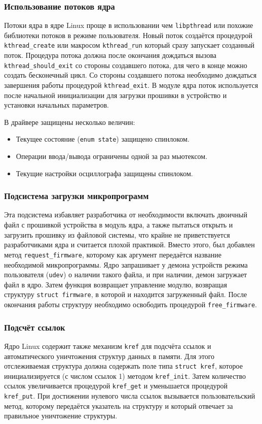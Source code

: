 \documentclass[a4paper,12pt]{report}
\numberwithin{equation}{section}
\begin{document}
\subsubsection{Использование потоков ядра}
Потоки ядра в ядре Linux проще в использовании чем \texttt{libpthread} или
похожие библиотеки потоков в режиме пользователя. Новый поток создаётся
процедурой \texttt{kthread\_create} или макросом \texttt{kthread\_run} который
сразу запускает созданный поток. Процедура потока должна после окончания
дождаться вызова \texttt{kthread\_should\_exit} со стороны создавшего потока,
для чего в конце можно создать бесконечный цикл. Со стороны создавшего потока
необходимо дождаться завершения работы процедурой \texttt{kthread\_exit}. В
модуле ядра поток используется после начальной инициализации для загрузки
прошивки в устройство и установки начальных параметров.

В драйвере защищены несколько величин:
\begin{itemize}
\item Текущее состояние (\texttt{enum state}) защищено спинлоком.
\item Операции ввода/вывода ограничены одной за раз мьютексом.
\item Текущие настройки осциллографа защищены спинлоком.
\end{itemize}

\subsubsection{Подсистема загрузки микропрограмм}
Эта подсистема избавляет разработчика от необходимости включать двоичный файл с
прошивкой устройства в модуль ядра, а также пытаться открыть и загрузить
прошивку из файловой системы, что крайне не приветствуется разработчиками ядра и
считается плохой практикой. Вместо этого, был добавлен метод
\texttt{request\_firmware}, которому как аргумент передаётся название необходимой
микропрограммы. Ядро запрашивает у демона устройств режима пользователя
(\texttt{udev}) о наличии такого файла, и при наличии, демон загружает файл в
ядро. Затем функция возвращает управление модулю, возвращая структуру
\texttt{struct firmware}, в которой и находится загруженный файл. После
окончания работы структуру необходимо освободить процедурой
\texttt{free\_firmware}.

\subsubsection{Подсчёт ссылок}
Ядро Linux содержит также механизм \texttt{kref} для подсчёта ссылок и
автоматического уничтожения структур данных в памяти. Для этого отслеживаемая
структура должна содержать поле типа \texttt{struct kref}, которое
инициализируется (с числом ссылок 1) методом \texttt{kref\_init}. Затем
количество ссылок увеличивается процедурой \texttt{kref\_get} и уменьшается
процедурой \texttt{kref\_put}. При достижении нулевого числа ссылок вызывается
пользовательский метод, которому передаётся указатель на структуру и который
отвечает за правильное уничтожение структуры.
\end{document}
